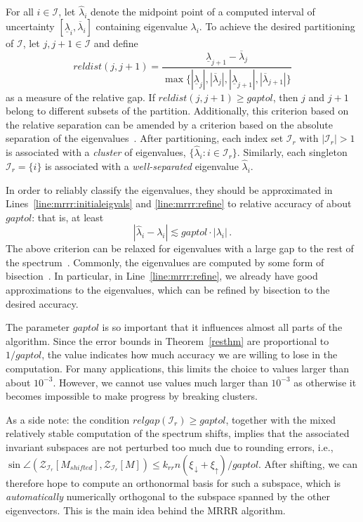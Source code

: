 \documentclass[final]{siamltex}
\begin{document}
For all $i \in \mathcal{I}$, let $\hat{\lambda}_i$ denote the midpoint point
of a computed interval of uncertainty
$[\underline{\lambda}_i,\overline{\lambda}_i]$ containing eigenvalue
$\lambda_i$. To achieve the desired partitioning of $\mathcal{I}$, let $j,j+1
\in \mathcal{I}$ and define 
\begin{equation*}
  reldist(j,j+1) = \frac{\underline{\lambda}_{j+1} -
    \overline{\lambda}_j}{\max\{ |\underline{\lambda}_j| ,
    |\overline{\lambda}_j|, |\underline{\lambda}_{j+1}| ,
    |\overline{\lambda}_{j+1}| \}}
\end{equation*}
as a measure of the relative gap. If $reldist(j,j+1) \geq gaptol$, then $j$ and
$j+1$ belong to different subsets of the partition. Additionally, this criterion
based on the relative separation can be amended by a criterion based on the
absolute separation of the eigenvalues~\cite{VoemelRefinedTree2007tr}. After
partitioning, each index set 
$\mathcal{I}_r$ with $|\mathcal{I}_r| > 1$ is associated with a {\it cluster}
of eigenvalues, $\{\hat{\lambda}_i : i \in \mathcal{I}_r\}$. Similarly, each
singleton $\mathcal{I}_r = \{i\}$ is associated with a {\it
  well-separated} eigenvalue $\hat{\lambda}_i$.

In order to reliably classify the
eigenvalues, they should be approximated in
Lines~\ref{line:mrrr:initialeigvals} and \ref{line:mrrr:refine} to relative
accuracy of about $gaptol$: that is, at least 
\begin{equation}
|\hat{\lambda}_i - \lambda_i| \lesssim gaptol \cdot |\lambda_i| \,.
\label{eq:relaccgaptol}
\end{equation}
The above criterion can be relaxed for
eigenvalues with a large gap to the rest of the
spectrum~\cite{DesignMRRR}. Commonly, the 
eigenvalues are computed by some form of 
bisection~\cite{Parlett:1998:SEP}. In 
particular, in Line~\ref{line:mrrr:refine}, we already have good
approximations to the eigenvalues, which can be refined by bisection to the
desired accuracy. 

The parameter $gaptol$ is so important that it influences almost all parts
of the algorithm. Since the error bounds in Theorem~\ref{resthm} are
proportional to $1/gaptol$, the value indicates how much accuracy we are willing to lose in the
computation. For many applications, this limits the choice to values larger than about
$10^{-3}$. However, we cannot use values much larger than
$10^{-3}$ as otherwise it becomes impossible to make progress by breaking
clusters. 

As a side note: the condition $relgap(\mathcal{I}_r) \geq gaptol$, together with the mixed
relatively stable computation of the spectrum shifts, implies that the
associated invariant subspaces are not 
perturbed too much due to rounding
errors, i.e., $\sin \angle
(\mathcal{Z}_{\mathcal{I}_r}[M_{shifted}],\mathcal{Z}_{\mathcal{I}_r}[M]) \leq
k_{rr} n (\xi_{\,\downarrow} + \xi_{\uparrow}) / gaptol$. After shifting, we can
therefore hope to compute an orthonormal 
basis for such a subspace, which is {\it automatically} numerically
orthogonal to the subspace spanned by the other eigenvectors. This is the
main idea behind the MRRR algorithm.
\end{document}
